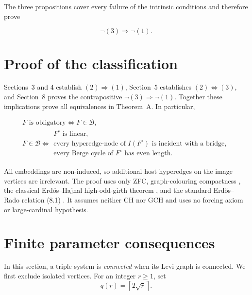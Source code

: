 \documentclass[a4paper,11pt,reqno]{amsart}
\theoremstyle{plain}
\theoremstyle{definition}
\theoremstyle{remark}
\begin{document}
The three propositions cover every failure of the intrinsic conditions and
therefore prove

\[
\neg(3)\Longrightarrow\neg(1). \tag{8.2}
\]

\section{Proof of the classification}\label{conclusion}

Sections~3 and 4 establish \((2)\Longrightarrow(1)\), Section~5 establishes
\((2)\Longleftrightarrow(3)\), and Section~8 proves the contrapositive
\(\neg(3)\Longrightarrow\neg(1)\).  Together these implications prove all
equivalences in Theorem~A.  In particular,

\begingroup\small
\[
\begin{gathered}
F\text{ is obligatory}
\iff
F\in\mathcal B,\\[1mm]
F\in\mathcal B
\iff
\begin{array}{l}
F^\circ\text{ is linear},\\[1mm]
\text{every hyperedge-node of }I(F^\circ)
\text{ is incident with a bridge},\\[1mm]
\text{every Berge cycle of }F^\circ\text{ has even length}.
\end{array}
\end{gathered}
\]
\endgroup

All embeddings are non-induced, so additional host hyperedges on the image
vertices are irrelevant.  The proof uses only ZFC, graph-colouring
compactness \citep{debruijn1951}, the classical Erd\H{o}s--Hajnal high-odd-girth theorem \citep{erdoshajnal1966}, and the
standard Erd\H{o}s--Rado relation (8.1) \citep{erdosrado1956}.  It assumes neither CH nor GCH and
uses no forcing axiom or large-cardinal hypothesis.

\section{Finite parameter consequences}\label{finite-parameter-consequences}

In this section, a triple system is \emph{connected} when its Levi graph is
connected.  We first exclude isolated vertices.  For an integer $r\ge1$, set
\[
q(r)=\left\lceil2\sqrt r\right\rceil.
\]
\end{document}

